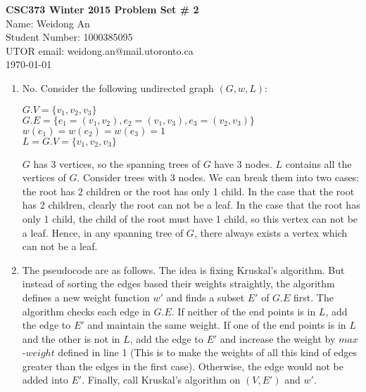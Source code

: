 \documentclass[11pt]{article}
\begin{document}
\begin{center}
{\bf \Large \bf CSC373 Winter 2015 Problem Set \# 2}\\
Name: Weidong An\\
Student Number: 1000385095\\
UTOR email: weidong.an@mail.utoronto.ca\\
\today\\
\end{center}

\begin{enumerate}[label=(\alph*)]

\item
No. Consider the following undirected graph $(G, w, L)$:
\begin{center}
$G.V = \{v_1, v_2, v_3\}$\\
$G.E = \{{e_1=(v_1, v_2), e_2=(v_1, v_3), e_3=(v_2, v_3)}\}$\\
$w(e_1)=w(e_2)=w(e_3)=1$\\
$L = G.V = \{v_1, v_2, v_3\}$
\end{center}

$G$ has 3 vertices, so the spanning trees of $G$ have 3 nodes. $L$ contains all the vertices of $G$.  Consider trees with 3 nodes. We can break them into two cases: the root has 2 children or the root has only 1 child. In the case that the root has 2 children, clearly the root can not be a leaf. In the case that the root has only 1 child, the child of the root must have 1 child, so this vertex can not be a leaf. Hence, in any spanning tree of $G$, there always exists a vertex which can not be a leaf.


\item

The pseudocode are as follows. The idea is fixing Kruskal's algorithm. But instead of sorting the edges based their weights straightly, the algorithm defines a new weight function $w'$ and finds a subset $E'$ of $G.E$ first. The algorithm checks each edge in $G.E$. If neither of the end points is in $L$, add the edge to $E'$ and maintain the same weight. If one of the end points is in $L$ and the other is not in $L$, add the edge to $E'$ and increase the weight by $max$-$weight$ defined in line 1 (This is to make the weights of all this kind of edges greater than the edges in the first case). Otherwise, the edge would not be added into $E'$. Finally, call Kruskal's algorithm on $(V, E')$ and $w'.$
\begin{codebox}


\end{codebox}
\end{enumerate}
\end{document}
